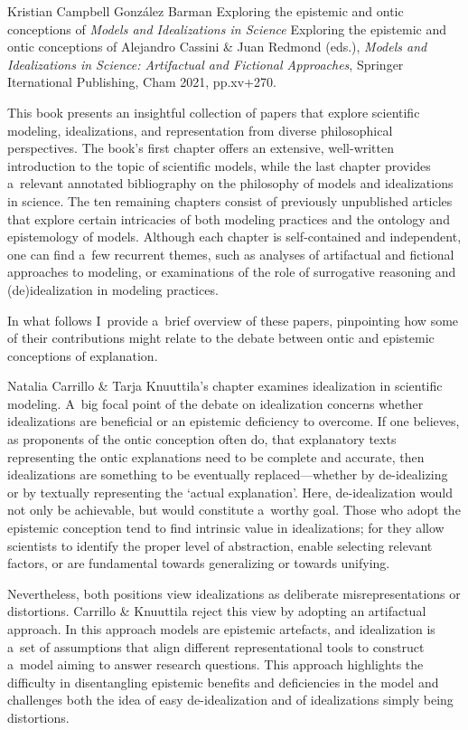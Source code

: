 \begin{recengenv}{Kristian Campbell González Barman}
	{Exploring the epistemic and ontic conceptions of \textit{Models and Idealizations in Science}}
	{Exploring the epistemic and ontic conceptions of }
	{Alejandro Cassini \& Juan Redmond (eds.), {\textit{Models and Idealizations in Science: Artifactual and Fictional Approaches}}, Springer Iternational Publishing, Cham 2021, pp.xv+270.}


\noindent This book presents an insightful collection of papers that explore scientific modeling, idealizations, and representation from diverse philosophical perspectives. The book's first chapter offers an extensive, well-written introduction to the topic of scientific models, while the last chapter provides a~relevant annotated bibliography on the philosophy of models and idealizations in science. The ten remaining chapters consist of previously unpublished articles that explore certain intricacies of both modeling practices and the ontology and epistemology of models. Although each chapter is self-contained and independent, one can find a~few recurrent themes, such as analyses of artifactual and fictional approaches to modeling, or examinations of the role of surrogative reasoning and (de)idealization in modeling practices.

In what follows I~provide a~brief overview of these papers, pinpointing how some of their contributions might relate to the debate between ontic and epistemic conceptions of explanation.

Natalia Carrillo \& Tarja Knuuttila's chapter examines idealization in scientific modeling. A~big focal point of the debate on idealization concerns whether idealizations are beneficial or an epistemic deficiency to overcome. If one believes, as proponents of the ontic conception often do, that explanatory texts representing the ontic explanations need to be complete and accurate, then idealizations are something to be eventually replaced---whether by de-idealizing or by textually representing the ‘actual explanation'. Here, de-idealization would not only be achievable, but would constitute a~worthy goal. Those who adopt the epistemic conception tend to find intrinsic value in idealizations; for they allow scientists to identify the proper level of abstraction, enable selecting relevant factors, or are fundamental towards generalizing or towards unifying.

Nevertheless, both positions view idealizations as deliberate misrepresentations or distortions. Carrillo \& Knuuttila reject this view by adopting an artifactual approach. In this approach models are epistemic artefacts, and idealization is a~set of assumptions that align different representational tools to construct a~model aiming to answer research questions. This approach highlights the difficulty in disentangling epistemic benefits and deficiencies in the model and challenges both the idea of easy de-idealization and of idealizations simply being distortions.


\end{recengenv}
